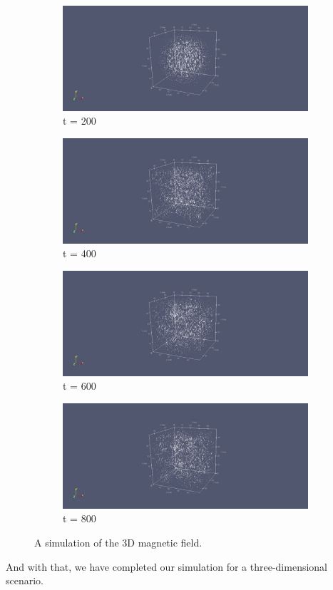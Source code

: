 \begin{figure}[h!]
	\centering
	\begin{subfigure}{.49\textwidth}
		\centering
		\includegraphics[width=.95\linewidth]{Figures/FDTD3DH1}
		\caption{t = 200}
	\end{subfigure}
	\begin{subfigure}{.49\textwidth}
		\centering
		\includegraphics[width=.95\linewidth]{Figures/FDTD3DH2}
		\caption{t = 400}
	\end{subfigure}
	\begin{subfigure}{.49\textwidth}
		\centering
		\includegraphics[width=.95\linewidth]{Figures/FDTD3DH3}
		\caption{t = 600}
	\end{subfigure}
	\begin{subfigure}{.49\textwidth}
		\centering
		\includegraphics[width=.95\linewidth]{Figures/FDTD3DH4}
		\caption{t = 800}
	\end{subfigure}
	\decoRule
	\caption[3D Magnetic Field Simulation]{A simulation of the 3D magnetic field.}
	\label{fig:FDTD3DH}
\end{figure}

And with that, we have completed our simulation for a three-dimensional scenario. 